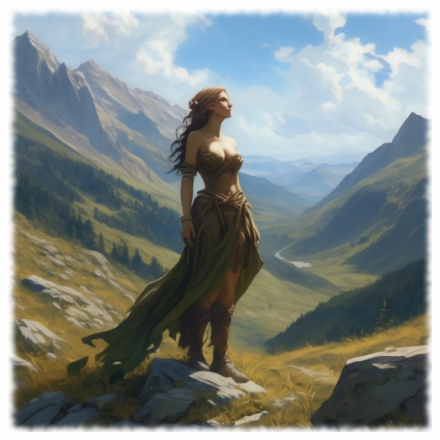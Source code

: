 
\begin{figure}[h]
\begin{center}
\includegraphics[scale=0.24]{img/ai-images/oread.png}
\end{center}
\end{figure}
